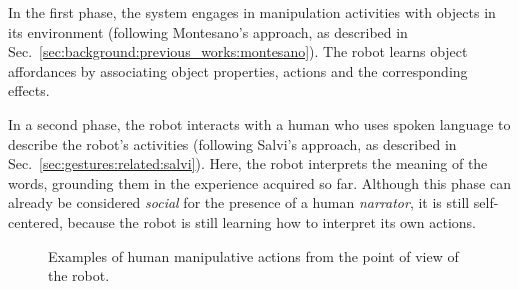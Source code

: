 In the first phase, the system engages in manipulation activities with objects in its environment (following Montesano's approach, as described in Sec.~\ref{sec:background:previous_works:montesano}).
The robot learns object affordances by associating object properties, actions and the corresponding effects.

In a second phase, the robot interacts with a human who uses spoken language to describe the robot's activities (following Salvi's approach, as described in Sec.~\ref{sec:gestures:related:salvi}).
Here, the robot interprets the meaning of the words, grounding them in the \actionperception{} experience acquired so far.
Although this phase can already be considered \emph{social} for the presence of a human \emph{narrator}, it is still self-centered, because the robot is still learning how to interpret its own actions.

\begin{figure*}
  \centering


  \caption{Examples of human manipulative actions from the point of view of the robot.}
  \label{fig:gestures:human_action_examples}
\end{figure*}

